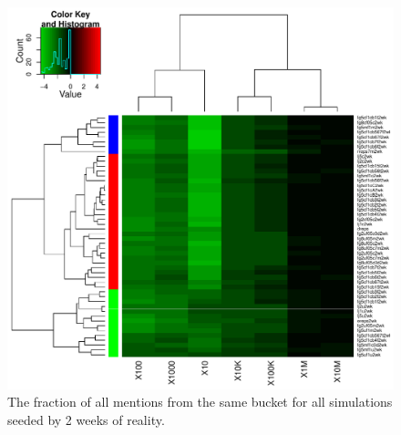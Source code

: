 \documentclass[10pt,oneside]{memoir}
\begin{document}
\begin{Spacing}{2}
\begin{figure}
\begin{center}
    \includegraphics{figures/crop/heatmap-b2bm-self-rel-medians-log10-2wk}
    \caption{The fraction of all mentions from the same bucket for all simulations seeded by 2 weeks of reality.}
    \label{figure:heatmap-b2bm-self-rel-medians-2wk}
\end{center}
\end{figure}


\end{Spacing}
\end{document}
